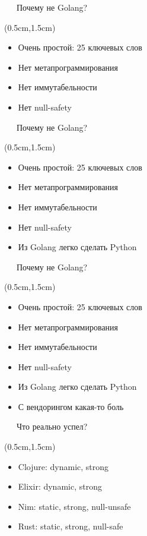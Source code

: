 \documentclass[xetex,18pt,aspectratio=43]{beamer}
\begin{document}
\begin{Large}
\begin{frame}{\ \ \ Почему не Golang?}
\begin{textblock*}{\framewidth-0.8cm}(0.5cm,1.5cm)
\begin{itemize}
  \item Очень простой: 25 ключевых слов
  \item Нет метапрограммирования
  \item Нет иммутабельности
  \item Нет null-safety
\end{itemize}
\end{textblock*}
\end{frame}

\begin{frame}{\ \ \ Почему не Golang?}
\begin{textblock*}{\framewidth-0.8cm}(0.5cm,1.5cm)
\begin{itemize}
  \item Очень простой: 25 ключевых слов
  \item Нет метапрограммирования
  \item Нет иммутабельности
  \item Нет null-safety
  \item Из Golang легко сделать Python
\end{itemize}
\end{textblock*}
\end{frame}

\begin{frame}{\ \ \ Почему не Golang?}
\begin{textblock*}{\framewidth-0.8cm}(0.5cm,1.5cm)
\begin{itemize}
  \item Очень простой: 25 ключевых слов
  \item Нет метапрограммирования
  \item Нет иммутабельности
  \item Нет null-safety
  \item Из Golang легко сделать Python
  \item С вендорингом какая-то боль
\end{itemize}
\end{textblock*}
\end{frame}

\begin{frame}{\ \ \ Что реально успел?}
\begin{textblock*}{\framewidth-0.8cm}(0.5cm,1.5cm)
\begin{itemize}
  \item Clojure: dynamic, strong
  \item Elixir: dynamic, strong
  \item Nim: static, strong, null-unsafe
  \item Rust: static, strong, null-safe
\end{itemize}
\end{textblock*}
\end{frame}


\end{Large}
\end{document}

